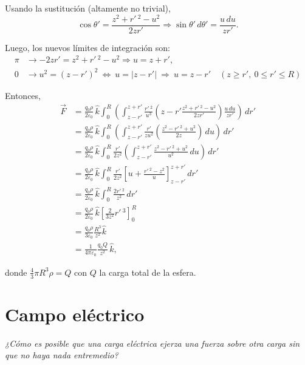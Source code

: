 \begin{ejemplo}
Usando la sustitución (altamente no trivial),
$$\cos \theta' = \frac{z^2 + r'\,^2 - u^2}{2zr'} \Rightarrow \sin \theta'\, d\theta' = \frac{u\,du}{zr'}.$$

Luego, los nuevos límites de integración son:
\begin{align*}
    \pi &\longrightarrow -2zr' = z^2+r'\,^2 -u^2 \Rightarrow  u = z + r', \\
    0 &\longrightarrow u^2 = (z-r')^2 ~\Leftrightarrow~ u = |z-r'| ~\Rightarrow ~ u = z - r'\quad (z \geq r',~ 0 \leq r' \leq R)
\end{align*}

Entonces, 
\begin{align*}
    \Vec{F} &= \frac{ q_0 \rho}{2 \varepsilon_0} \, \hat{k}  \int_0^R \left(\int_{z-r'}^{z+r'} \frac{r'\,^2}{u^3} \left(z- r' \frac{z^2 + r'\,^2 - u^2}{2z r'} \right)  \frac{u \,du}{zr'} \right) \,dr' \\
    &= \frac{ q_0 \rho}{2 \varepsilon_0} \, \hat{k}  \int_0^R \left(\int_{z-r'}^{z+r'} \frac{r'}{z u^2} \left( \frac{z^2 - r'\,^2 + u^2}{2z}  \right) \,du \right) \,dr' \\
    &= \frac{ q_0 \rho}{2 \varepsilon_0} \, \hat{k}  \int_0^R \frac{r'}{2z^2}\left(\int_{z-r'}^{z+r'}  \frac{z^2 - r'\,^2 + u^2}{u^2}  \,du \right) \,dr' \\
    &=  \frac{ q_0 \rho}{2 \varepsilon_0} \, \hat{k}  \int_0^R \frac{r'}{2z^2}\left[ u + \frac{r'\,^2 -z^2}{u} \right]_{z-r'}^{z+r'} \,dr' \\
    &= \frac{ q_0 \rho}{2 \varepsilon_0} \, \hat{k}  \int_0^R \frac{2 r'\,^2}{z^2} \,dr' \\
    &= \frac{ q_0 \rho}{2 \varepsilon_0} \, \hat{k}  \left[ \frac{2}{3z^2} r'\,^3 \right]_0^R \\
    &= \frac{q_0 \rho}{3 \varepsilon_0} \frac{R^3}{z^2} \hat{k} \\
    &= \frac{1}{4\pi \varepsilon_0} \frac{q_0 Q}{z^2} \,\hat{k},
\end{align*}

donde $\frac{4}{3} \pi R^3 \rho = Q$ con $Q$ la carga total de la esfera.
\end{ejemplo}

 \section{Campo eléctrico}

\textit{¿Cómo es posible que una carga eléctrica ejerza una fuerza sobre otra carga sin que no haya nada entremedio?}

